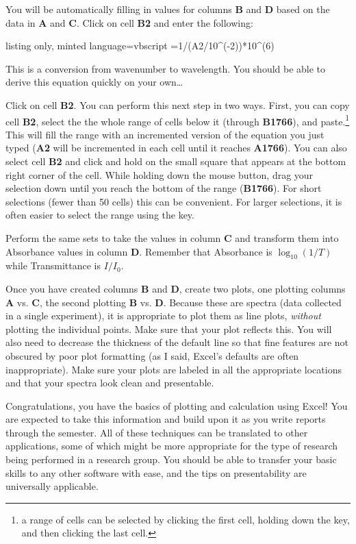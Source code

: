 \documentclass[nobib,nofonts,nols,nohyper]{tufte-handout}
\begin{document}
You will be automatically filling in values for columns \textbf{B} and \textbf{D} based on the data in \textbf{A} and \textbf{C}. 
Click on cell \textbf{B2} and enter the following:

\begin{tcblisting}{listing only,
minted language=vbscript}
=1/(A2/10^(-2))*10^(6)
\end{tcblisting}

This is a conversion from wavenumber to wavelength. 
You should be able to derive this equation quickly on your own…

Click on cell \textbf{B2}. 
You can perform this next step in two ways. 
First, you can copy cell \textbf{B2}, select the the whole range of cells below it (through \textbf{B1766}), and paste.\footnote{a range of cells can be selected by clicking the first cell, holding down the  key, and then clicking the last cell.} 
This will fill the range with an incremented version of the equation you just typed (\textbf{A2} will be incremented in each cell until it reaches \textbf{A1766}). 
You can also select cell \textbf{B2} and click and hold on the small square that appears at the bottom right corner of the cell. 
While holding down the mouse button, drag your selection down until you reach the bottom of the range (\textbf{B1766}). 
For short selections (fewer than 50 cells) this can be convenient. 
For larger selections, it is often easier to select the range using the  key.

Perform the same sets to take the values in column \textbf{C} and transform them into Absorbance values in column \textbf{D}. 
Remember that Absorbance is \(\log_{10}(1/T)\) while Transmittance is \(I / I_0\).

Once you have created columns \textbf{B} and \textbf{D}, create two plots, one plotting columns \textbf{A} vs. \textbf{C}, the second plotting \textbf{B} vs. \textbf{D}. 
Because these are spectra (data collected in a single experiment), it is appropriate to plot them as line plots, \emph{without} plotting the individual points. 
Make sure that your plot reflects this. 
You will also need to decrease the thickness of the default line so that fine features are not obscured by poor plot formatting (as I said, Excel's defaults are often inappropriate). 
Make sure your plots are labeled in all the appropriate locations and that your spectra look clean and presentable.

Congratulations, you have the basics of plotting and calculation using Excel! 
You are expected to take this information and build upon it as you write reports through the semester. 
All of these techniques can be translated to other applications, some of which might be more appropriate for the type of research being performed in a research group. 
You should be able to transfer your basic skills to any other software with ease, and the tips on presentability are universally applicable.
\end{document}
